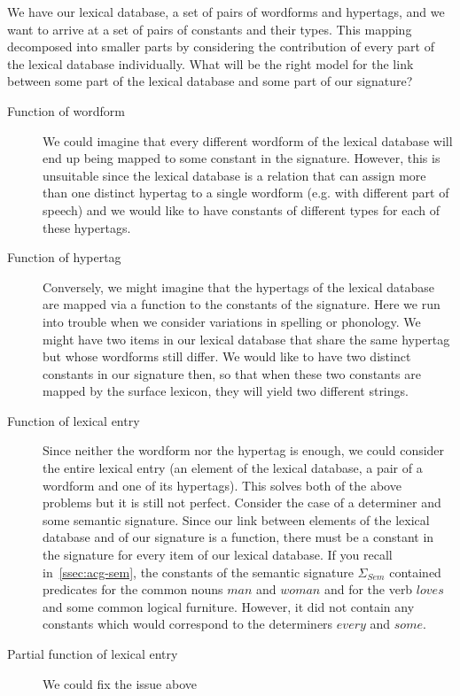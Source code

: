 We have our lexical database, a set of pairs of wordforms and hypertags,
and we want to arrive at a set of pairs of constants and their
types. This mapping decomposed into smaller parts by considering the
contribution of every part of the lexical database individually. What
will be the right model for the link between some part of the lexical
database and some part of our signature?

\begin{description}
  \item[Function of wordform] We could imagine that every different
    wordform of the lexical database will end up being mapped to some
    constant in the signature. However, this is unsuitable since the
    lexical database is a relation that can assign more than one
    distinct hypertag to a single wordform (e.g. with different part of
    speech) and we would like to have constants of different types for
    each of these hypertags.
  \item[Function of hypertag] Conversely, we might imagine that the
    hypertags of the lexical database are mapped via a function to the
    constants of the signature. Here we run into trouble when we
    consider variations in spelling or phonology. We might have two
    items in our lexical database that share the same hypertag but whose
    wordforms still differ. We would like to have two distinct constants
    in our signature then, so that when these two constants are mapped
    by the surface lexicon, they will yield two different strings.
  \item[Function of lexical entry] Since neither the wordform nor the
    hypertag is enough, we could consider the entire lexical entry (an
    element of the lexical database, a pair of a wordform and one of its
    hypertags). This solves both of the above problems but it is still
    not perfect. Consider the case of a determiner and some semantic
    signature. Since our link between elements of the lexical database
    and of our signature is a function, there must be a constant in the
    signature for every item of our lexical database. If you recall
    in~\ref{ssec:acg-sem}, the constants of the semantic signature
    $\Sigma_{Sem}$ contained predicates for the common nouns $man$ and
    $woman$ and for the verb $loves$ and some common logical
    furniture. However, it did not contain any constants which would
    correspond to the determiners $every$ and $some$.
  \item[Partial function of lexical entry] We could fix the issue above

\end{description}
